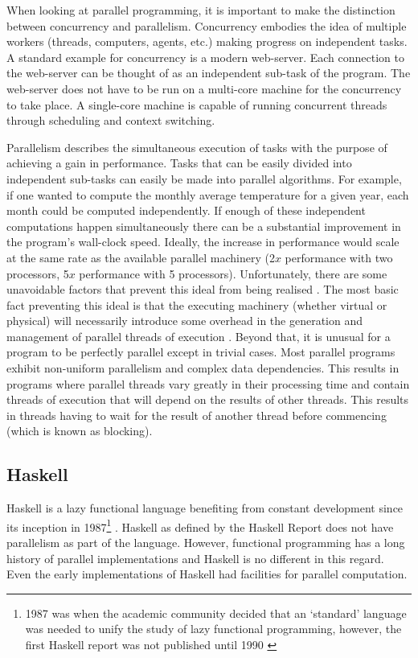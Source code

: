 When looking at parallel programming, it is important to make the distinction
between concurrency and parallelism.  Concurrency embodies the idea of multiple
workers (threads, computers, agents, etc.) making progress on independent
tasks. A standard example for concurrency is a modern web-server. Each
connection to the web-server can be thought of as an independent sub-task of
the program. The web-server does not have to be run on a multi-core machine for
the concurrency to take place. A single-core machine is capable of running
concurrent threads through scheduling and context switching.

Parallelism describes the simultaneous execution of tasks with the purpose of
achieving a gain in performance. Tasks that can be easily divided into
independent sub-tasks can easily be made into parallel algorithms. For example,
if one wanted to compute the monthly average temperature for a given year, each
month could be computed independently.  If enough of these independent
computations happen simultaneously there can be a substantial improvement in
the program's wall-clock speed. Ideally, the increase in performance would
scale at the same rate as the available parallel machinery (2$x$ performance
with two processors, 5$x$ performance with 5 processors). Unfortunately, there
are some unavoidable factors that prevent this ideal from being realised
\citep{hughes:thesis,HistoryOfHaskell,PFPAnIntro}. The most basic fact
preventing this ideal is that the executing machinery (whether virtual or
physical) will necessarily introduce some overhead in the generation and
management of parallel threads of execution \citep{PeytonJones:IFL}. Beyond
that, it is unusual for a program to be perfectly parallel except in trivial
cases. Most parallel programs exhibit non-uniform parallelism and complex data
dependencies. This results in programs where parallel threads vary greatly in
their processing time and contain threads of execution that will depend on the
results of other threads. This results in threads having to wait for the result
of another thread before commencing (which is known as blocking).

\subsection{Haskell}

Haskell is a lazy functional language benefiting from constant development
since its inception in 1987\footnote{1987 was when the academic community
decided that an `standard' language was needed to unify the study of lazy
functional programming\citep{HistoryOfHaskell}, however, the first Haskell
report was not published until 1990 \citep{Haskell98Book}}
\citep{HistoryOfHaskell, Haskell98Book}. Haskell as defined by the Haskell
Report \citep{haskellReport} does not have parallelism as part of the language.
However, functional programming has a long history of parallel implementations
and Haskell is no different in this regard. Even the early implementations of
Haskell had facilities for parallel computation.

